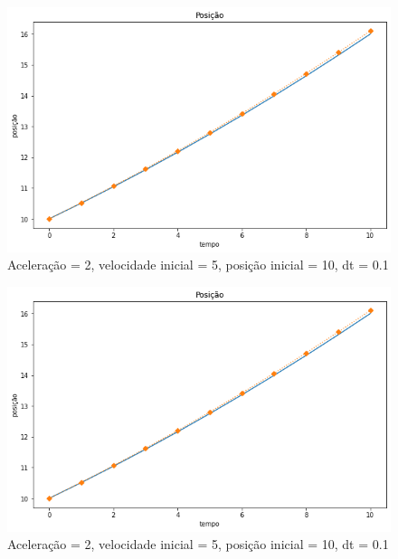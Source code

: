 \documentclass[12pt]{article}
\begin{document}
\begin{figure}[H]
  \centering
  \includegraphics[scale = 0.6]{imagens/dt=0.1 tf=1 posicao.png}
  \caption{Aceleração = 2, velocidade inicial = 5, posição inicial = 10, dt = 0.1}
\end{figure}
\begin{figure}[H]
  \centering
  \includegraphics[scale = 0.6]{imagens/dt=0.1 tf=1 posicao.png}
  \caption{Aceleração = 2, velocidade inicial = 5, posição inicial = 10, dt = 0.1}
\end{figure}
\end{document}
